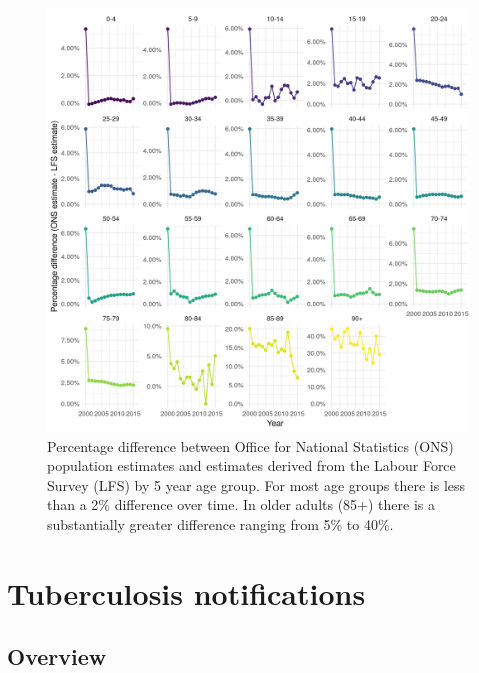 \documentclass[11pt,twoside]{bristolthesis}
\begin{document}
  \begin{figure}
  
  {\centering \includegraphics[width=0.8\linewidth]{chapters/tb-epi-england/figures/plot-age-strat} 
  
  }
  
  \caption{Percentage difference between Office for National Statistics (ONS) population estimates and estimates derived from the Labour Force Survey (LFS) by 5 year age group. For most age groups there is less than a 2\% difference over time. In older adults (85+) there is a substantially greater difference ranging from 5\% to 40\%.}\label{fig:plot-age-strat}
  \end{figure}
  \hypertarget{tuberculosis-notifications}{%
  \section{Tuberculosis notifications}\label{tuberculosis-notifications}}
  
  \hypertarget{overview}{%
  \subsection{Overview}\label{overview}}
  
\end{document}
